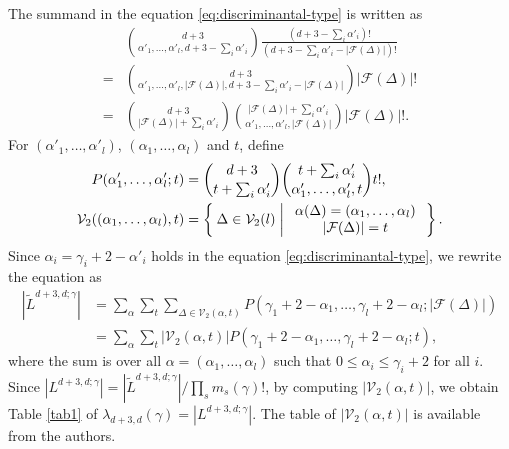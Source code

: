\documentclass{wstmp}
\begin{document}
The summand in the equation \eqref{eq:discriminantal-type}
is written as
\begin{align*}
&\binom{d+3}{\alpha'_1,\ldots,\alpha'_l, d+3-\sum_i\alpha'_i}
\frac{(d+3-\sum_i\alpha'_i) !}{ (d+3-\sum_i\alpha'_i-{\left|{{\mathcal{F}}(\Delta)}\right|})!}
\\
=&
\binom{d+3}{\alpha'_1,\ldots,\alpha'_l, {\left|{{\mathcal{F}}(\Delta)}\right|},d+3-\sum_i\alpha'_i-{\left|{{\mathcal{F}}(\Delta)}\right|}}
{\left|{{\mathcal{F}}(\Delta)}\right|}!\\
=&
\binom{d+3}{ {\left|{{\mathcal{F}}(\Delta)}\right|} +\sum_i\alpha'_i}
\binom{ {\left|{{\mathcal{F}}(\Delta)}\right|}  +\sum_i\alpha'_i}
{\alpha'_1,\ldots,\alpha'_l,{\left|{{\mathcal{F}}(\Delta)}\right|}}
{\left|{{\mathcal{F}}(\Delta)}\right|}!.
\end{align*}
For $(\alpha'_1,\ldots,\alpha'_l)$, $(\alpha_1,\ldots,\alpha_l)$ and
$t$, 
define
\begin{align*}
P(\alpha'_1,\ldots,\alpha'_l;t)&=
\binom{d+3}{ t +\sum_i\alpha'_i}
\binom{ t  +\sum_i\alpha'_i}
{\alpha'_1,\ldots,\alpha'_l,t}t!,\\
{\mathcal{V}}_2((\alpha_1,\ldots,\alpha_l),t)
&=\Set{\Delta \in {\mathcal{V}}_2(l)| 
\begin{array}{c}
\alpha(\Delta)=(\alpha_1,\ldots,\alpha_l)\\
|{\mathcal{F}}(\Delta)|=t
\end{array}
}.
\end{align*}
Since $\alpha_i=\gamma_i+2-\alpha'_i$ holds in the equation \eqref{eq:discriminantal-type},
we rewrite the equation
as
\begin{align*}
{\left|{\tilde L^{d+3,d;\gamma}}\right|}
&=
 \sum_{\alpha}
\sum_t \sum_{\Delta \in {\mathcal{V}}_2(\alpha,t)}
P(\gamma_1+2-\alpha_1,\ldots,\gamma_l+2-\alpha_l;{\left|{{\mathcal{F}}(\Delta)}\right|})
\\
&=
 \sum_{\alpha}
\sum_t {\left|{{\mathcal{V}}_2(\alpha,t)}\right|}
P(\gamma_1+2-\alpha_1,\ldots,\gamma_l+2-\alpha_l;t),
\end{align*}
where the sum is over all $\alpha=(\alpha_1,\ldots,\alpha_l)$
such that $0\leq \alpha_i \leq \gamma_i+2$ for all $i$.
Since ${\left|{ L^{d+3,d;\gamma}}\right|}={\left|{\tilde L^{d+3,d;\gamma}}\right|}/\prod_s m_s(\gamma)!$,
by computing ${\left|{{\mathcal{V}}_2(\alpha,t)}\right|}$,
we obtain 
Table \ref{tab1} of $\lambda_{d+3,d}(\gamma)={\left|{ L^{d+3,d;\gamma}}\right|}$.
The table of ${\left|{{\mathcal{V}}_2(\alpha,t)}\right|}$ is available from the authors.
\end{document}
